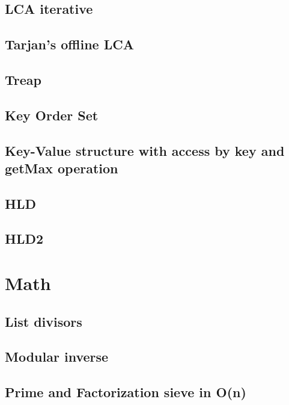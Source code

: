 \documentclass[a4paper]{article}
\begin{document}
\begin{multicols*}{2}
    \subsection{LCA iterative}
        
    \subsection{Tarjan's offline LCA}
        
    \subsection{Treap}
        
    \subsection{Key Order Set}
        
    \subsection{Key-Value structure with access by key and getMax operation}
        
    \subsection{HLD}
        
    \subsection{HLD2}
            

\section{Math}
    \subsection{List divisors}
        
    \subsection{Modular inverse}
        
    \subsection{Prime and Factorization sieve in O(n)}
        

\end{multicols*}
\end{document}
